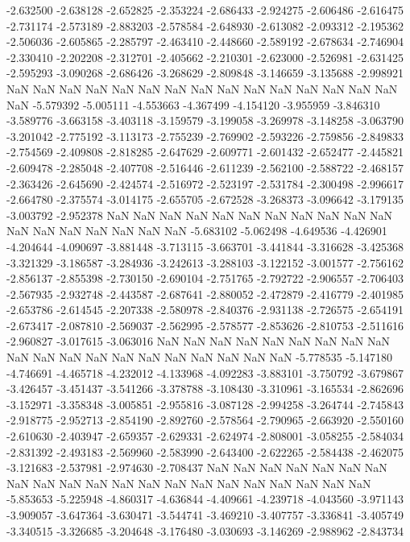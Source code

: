 -2.632500
-2.638128
-2.652825
-2.353224
-2.686433
-2.924275
-2.606486
-2.616475
-2.731174
-2.573189
-2.883203
-2.578584
-2.648930
-2.613082
-2.093312
-2.195362
-2.506036
-2.605865
-2.285797
-2.463410
-2.448660
-2.589192
-2.678634
-2.746904
-2.330410
-2.202208
-2.312701
-2.405662
-2.210301
-2.623000
-2.526981
-2.631425
-2.595293
-3.090268
-2.686426
-3.268629
-2.809848
-3.146659
-3.135688
-2.998921
NaN
NaN
NaN
NaN
NaN
NaN
NaN
NaN
NaN
NaN
NaN
NaN
NaN
NaN
NaN
NaN
-5.579392
-5.005111
-4.553663
-4.367499
-4.154120
-3.955959
-3.846310
-3.589776
-3.663158
-3.403118
-3.159579
-3.199058
-3.269978
-3.148258
-3.063790
-3.201042
-2.775192
-3.113173
-2.755239
-2.769902
-2.593226
-2.759856
-2.849833
-2.754569
-2.409808
-2.818285
-2.647629
-2.609771
-2.601432
-2.652477
-2.445821
-2.609478
-2.285048
-2.407708
-2.516446
-2.611239
-2.562100
-2.588722
-2.468157
-2.363426
-2.645690
-2.424574
-2.516972
-2.523197
-2.531784
-2.300498
-2.996617
-2.664780
-2.375574
-3.014175
-2.655705
-2.672528
-3.268373
-3.096642
-3.179135
-3.003792
-2.952378
NaN
NaN
NaN
NaN
NaN
NaN
NaN
NaN
NaN
NaN
NaN
NaN
NaN
NaN
NaN
NaN
NaN
NaN
-5.683102
-5.062498
-4.649536
-4.426901
-4.204644
-4.090697
-3.881448
-3.713115
-3.663701
-3.441844
-3.316628
-3.425368
-3.321329
-3.186587
-3.284936
-3.242613
-3.288103
-3.122152
-3.001577
-2.756162
-2.856137
-2.855398
-2.730150
-2.690104
-2.751765
-2.792722
-2.906557
-2.706403
-2.567935
-2.932748
-2.443587
-2.687641
-2.880052
-2.472879
-2.416779
-2.401985
-2.653786
-2.614545
-2.207338
-2.580978
-2.840376
-2.931138
-2.726575
-2.654191
-2.673417
-2.087810
-2.569037
-2.562995
-2.578577
-2.853626
-2.810753
-2.511616
-2.960827
-3.017615
-3.063016
NaN
NaN
NaN
NaN
NaN
NaN
NaN
NaN
NaN
NaN
NaN
NaN
NaN
NaN
NaN
NaN
NaN
NaN
NaN
NaN
-5.778535
-5.147180
-4.746691
-4.465718
-4.232012
-4.133968
-4.092283
-3.883101
-3.750792
-3.679867
-3.426457
-3.451437
-3.541266
-3.378788
-3.108430
-3.310961
-3.165534
-2.862696
-3.152971
-3.358348
-3.005851
-2.955816
-3.087128
-2.994258
-3.264744
-2.745843
-2.918775
-2.952713
-2.854190
-2.892760
-2.578564
-2.790965
-2.663920
-2.550160
-2.610630
-2.403947
-2.659357
-2.629331
-2.624974
-2.808001
-3.058255
-2.584034
-2.831392
-2.493183
-2.569960
-2.583990
-2.643400
-2.622265
-2.584438
-2.462075
-3.121683
-2.537981
-2.974630
-2.708437
NaN
NaN
NaN
NaN
NaN
NaN
NaN
NaN
NaN
NaN
NaN
NaN
NaN
NaN
NaN
NaN
NaN
NaN
NaN
NaN
NaN
-5.853653
-5.225948
-4.860317
-4.636844
-4.409661
-4.239718
-4.043560
-3.971143
-3.909057
-3.647364
-3.630471
-3.544741
-3.469210
-3.407757
-3.336841
-3.405749
-3.340515
-3.326685
-3.204648
-3.176480
-3.030693
-3.146269
-2.988962
-2.843734
